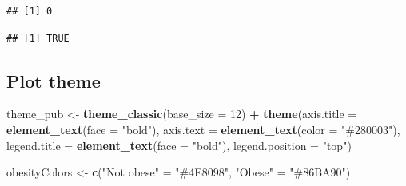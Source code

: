 \documentclass[
]{article}
\newenvironment{Shaded}{\begin{snugshade}}{\end{snugshade}}
\newcommand{\AttributeTok}[1]{\textcolor[rgb]{0.13,0.29,0.53}{#1}}
\newcommand{\CommentTok}[1]{\textcolor[rgb]{0.56,0.35,0.01}{\textit{#1}}}
\newcommand{\DecValTok}[1]{\textcolor[rgb]{0.00,0.00,0.81}{#1}}
\newcommand{\FunctionTok}[1]{\textcolor[rgb]{0.13,0.29,0.53}{\textbf{#1}}}
\newcommand{\NormalTok}[1]{#1}
\newcommand{\OtherTok}[1]{\textcolor[rgb]{0.56,0.35,0.01}{#1}}
\newcommand{\SpecialCharTok}[1]{\textcolor[rgb]{0.81,0.36,0.00}{\textbf{#1}}}
\newcommand{\StringTok}[1]{\textcolor[rgb]{0.31,0.60,0.02}{#1}}
\begin{document}
\begin{Shaded}
\end{Shaded}

\begin{verbatim}
## [1] 0
\end{verbatim}

\begin{Shaded}
\end{Shaded}

\begin{verbatim}
## [1] TRUE
\end{verbatim}

\subsection{Plot theme}\label{plot-theme}

\begin{Shaded}
\begin{Highlighting}[]
\NormalTok{theme\_pub }\OtherTok{\textless{}{-}} \FunctionTok{theme\_classic}\NormalTok{(}\AttributeTok{base\_size =} \DecValTok{12}\NormalTok{) }\SpecialCharTok{+}
  \FunctionTok{theme}\NormalTok{(}\AttributeTok{axis.title   =} \FunctionTok{element\_text}\NormalTok{(}\AttributeTok{face =} \StringTok{"bold"}\NormalTok{),}
        \AttributeTok{axis.text    =} \FunctionTok{element\_text}\NormalTok{(}\AttributeTok{color =} \StringTok{"\#280003"}\NormalTok{),}
        \AttributeTok{legend.title =} \FunctionTok{element\_text}\NormalTok{(}\AttributeTok{face =} \StringTok{"bold"}\NormalTok{),}
        \AttributeTok{legend.position =} \StringTok{"top"}\NormalTok{)}

\NormalTok{obesityColors }\OtherTok{\textless{}{-}} \FunctionTok{c}\NormalTok{(}\StringTok{"Not obese"} \OtherTok{=} \StringTok{"\#4E8098"}\NormalTok{, }\StringTok{"Obese"} \OtherTok{=} \StringTok{"\#86BA90"}\NormalTok{)}
\end{Highlighting}
\end{Shaded}
\end{document}
